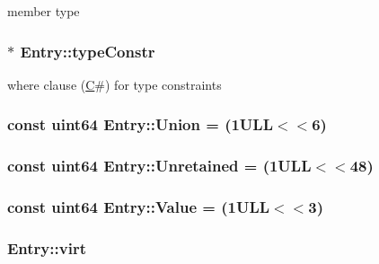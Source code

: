 member type 

\hypertarget{class_entry_a77d30ef01feb28bf83b77d4148968f84}{}
\subsubsection[{type\+Constr}]{$\ast$ Entry\+::type\+Constr}\label{class_entry_a77d30ef01feb28bf83b77d4148968f84}


where clause (\hyperlink{class_c}{C}\#) for type constraints 

\hypertarget{class_entry_a2954b31782155586b4d154cd8bcbaa86}{}
\subsubsection[{Union}]{\setlength{\rightskip}{0pt plus 5cm}const {\bf uint64} Entry\+::\+Union = (1\+U\+L\+L$<$$<$6)\hspace{0.3cm}{\ttfamily [static]}}\label{class_entry_a2954b31782155586b4d154cd8bcbaa86}
\hypertarget{class_entry_a64b2b777cba602e308b811702be5ab58}{}
\subsubsection[{Unretained}]{\setlength{\rightskip}{0pt plus 5cm}const {\bf uint64} Entry\+::\+Unretained = (1\+U\+L\+L$<$$<$48)\hspace{0.3cm}{\ttfamily [static]}}\label{class_entry_a64b2b777cba602e308b811702be5ab58}
\hypertarget{class_entry_aed8b4b067480b3b467f64363e390be17}{}
\subsubsection[{Value}]{\setlength{\rightskip}{0pt plus 5cm}const {\bf uint64} Entry\+::\+Value = (1\+U\+L\+L$<$$<$3)\hspace{0.3cm}{\ttfamily [static]}}\label{class_entry_aed8b4b067480b3b467f64363e390be17}
\hypertarget{class_entry_aaf045b9c026443fd192064117083911b}{}
\subsubsection[{virt}]{ Entry\+::virt}\label{class_entry_aaf045b9c026443fd192064117083911b}


